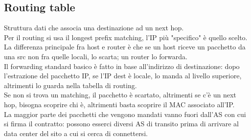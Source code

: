 \documentclass[12pt, oneside]{extbook} %
\begin{document}
\subsection{Routing table}
Struttura dati che associa una destinazione ad un next hop.
\\Per il routing si usa il longest prefix matching, l'IP più "specifico" è quello scelto.
\\La differenza principale fra host e router è che se un host riceve un pacchetto da una src non fra quelle locali, lo scarta; un router lo forwarda.
\\Il forwarding standard basico è fatto in base all'indirizzo di destinazione: dopo l'estrazione del pacchetto IP, se l'IP dest è locale, lo manda al livello superiore, altrimenti lo guarda nella tabella di routing.
\\Se non si trova un matching, il pacchetto è scartato, altrimenti se c'è un next hop, bisogna scoprire chi è, altrimenti basta scoprire il MAC associato all'IP.
\\La maggior parte dei pacchetti che vengono mandati vanno fuori dall'AS con cui si firma il contratto: possono esserci diversi AS di transito prima di arrivare al data center del sito a cui si cerca di connettersi.
\end{document}
